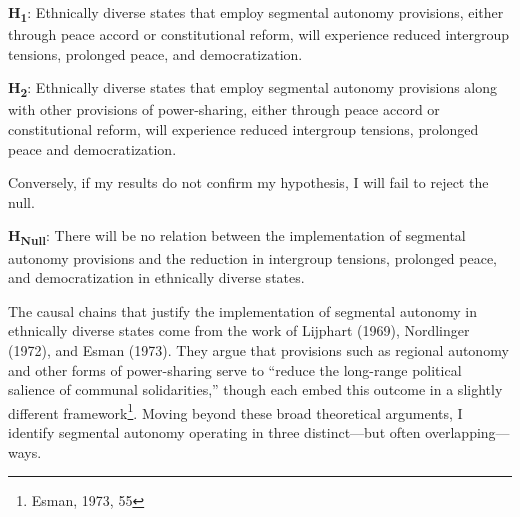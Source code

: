 \documentclass[12pt]{article}
\begin{document}
\singlespacing

\textbf{H\textsubscript{1}}: Ethnically diverse states that employ segmental autonomy provisions, either through peace accord or constitutional reform, will experience reduced intergroup tensions, prolonged peace, and democratization.

\bigskip

\textbf{H\textsubscript{2}}: Ethnically diverse states that employ segmental autonomy provisions along with other provisions of power-sharing, either through peace accord or constitutional reform, will experience reduced intergroup tensions, prolonged peace and democratization. 

\doublespacing

Conversely, if my results do not confirm my hypothesis, I will fail to reject the null. 

\singlespacing

\textbf{H\textsubscript{Null}}: There will be no relation between the implementation of segmental autonomy provisions and the reduction in intergroup tensions, prolonged peace, and democratization in ethnically diverse states. 

\doublespacing

The causal chains that justify the implementation of segmental autonomy in ethnically diverse states come from the work of Lijphart (1969), Nordlinger (1972), and Esman (1973). They argue that provisions such as regional autonomy and other forms of power-sharing serve to ``reduce the long-range political salience of communal solidarities,'' though each embed this outcome in a slightly different framework\footnote{Esman, 1973, 55}. Moving beyond these broad theoretical arguments, I identify segmental autonomy operating in three distinct---but often overlapping---ways. 
\end{document}
